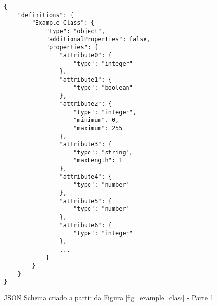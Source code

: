 \begin{anexosenv}
\begin{listing}
\begin{verbatim}
{     
    "definitions": {
        "Example_Class": {
            "type": "object",
            "additionalProperties": false,
            "properties": {
                "attribute0": {
                    "type": "integer"
                },
                "attribute1": {
                    "type": "boolean"
                },
                "attribute2": {
                    "type": "integer",
                    "minimum": 0,
                    "maximum": 255
                },
                "attribute3": {
                    "type": "string",
                    "maxLength": 1
                },
                "attribute4": {
                    "type": "number"
                },
                "attribute5": {
                    "type": "number"
                },
                "attribute6": {
                    "type": "integer"
                },
                ...
            }
        }
    }
}
\end{verbatim}
\caption{JSON Schema criado a partir da Figura \ref{fig_example_class} - Parte 1}
\end{listing}


\end{anexosenv}
